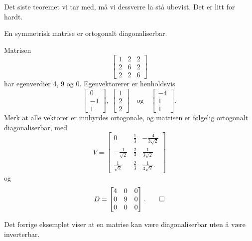 \noindent Det siste teoremet vi tar med, må vi dessverre la stå ubevist. Det er litt for hardt.
\begin{thm}
En  symmetrisk matrise er ortogonalt diagonaliserbar.
\end{thm}

\begin{ex}
Matrisen 
\[
\begin{bmatrix}
1 & 2 & 2\\  2 &6 & 2 \\ 2 & 2 & 6
\end{bmatrix}
\]
har egenverdier 4, 9 og 0. Egenvektorerer er henholdsvis
\[
\begin{bmatrix}
0 \\ -1 \\ 1
\end{bmatrix},
\;
\begin{bmatrix}
1 \\ 2 \\ 2
\end{bmatrix}
\quad \text{og} \quad
\begin{bmatrix}
-4 \\ 1 \\ 1
\end{bmatrix}.
\]
Merk at alle vektorer er innbyrdes ortogonale, og matrisen er følgelig ortogonalt diagonaliserbar, med
\[
V=
\begin{bmatrix}
0 & \frac{1}{3} & -\frac{4}{3\sqrt{2}}\\  -\frac{1}{\sqrt{2}} &\frac{2}{3} &  \frac{1}{3\sqrt{2}} \\ \frac{1}{\sqrt{2}} & \frac{2}{3} &  \frac{1}{3\sqrt{2}}.
\end{bmatrix}
\]
og 
\[
D=
\begin{bmatrix}
4 & 0 & 0\\  0 &9 & 0 \\ 0 & 0 & 0
\end{bmatrix}. \qedhere
\]
\end{ex}

\begin{merkx}
Det forrige eksemplet viser at en matrise kan være diagonaliserbar uten å være inverterbar.
\end{merkx}







\kapittelslutt

